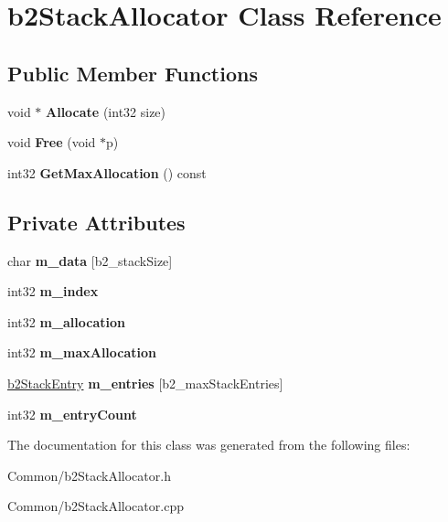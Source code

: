 \hypertarget{classb2StackAllocator}{}\section{b2\+Stack\+Allocator Class Reference}
\label{classb2StackAllocator}
\subsection*{Public Member Functions}
\begin{DoxyCompactItemize}
\item 
\mbox{\label{classb2StackAllocator_a4b8c515d8e1a1c2d5b151c3a2f96fa19}} 
void $\ast$ {\bfseries Allocate} (int32 size)
\item 
\mbox{\label{classb2StackAllocator_a3a4384cf5f467828db3022985673db66}} 
void {\bfseries Free} (void $\ast$p)
\item 
\mbox{\label{classb2StackAllocator_a9670b9ce67f939004f227d1be883404f}} 
int32 {\bfseries Get\+Max\+Allocation} () const
\end{DoxyCompactItemize}
\subsection*{Private Attributes}
\begin{DoxyCompactItemize}
\item 
\mbox{\label{classb2StackAllocator_a8f92993e1115afc12f0a8ef91dafb2db}} 
char {\bfseries m\+\_\+data} \mbox{[}b2\+\_\+stack\+Size\mbox{]}
\item 
\mbox{\label{classb2StackAllocator_ad639a2c5f0311d560808a432145880ff}} 
int32 {\bfseries m\+\_\+index}
\item 
\mbox{\label{classb2StackAllocator_a111e25a7ddc869c5087ecadf8cd79f13}} 
int32 {\bfseries m\+\_\+allocation}
\item 
\mbox{\label{classb2StackAllocator_ab77bbb95bc3506e1a4fdb0f2733a57d9}} 
int32 {\bfseries m\+\_\+max\+Allocation}
\item 
\mbox{\label{classb2StackAllocator_a493e5a470028ffbeea30c1a5e973897e}} 
\mbox{\hyperlink{structb2StackEntry}{b2\+Stack\+Entry}} {\bfseries m\+\_\+entries} \mbox{[}b2\+\_\+max\+Stack\+Entries\mbox{]}
\item 
\mbox{\label{classb2StackAllocator_a8c7f90ede3160a2c3c86cdbd80c22065}} 
int32 {\bfseries m\+\_\+entry\+Count}
\end{DoxyCompactItemize}


The documentation for this class was generated from the following files\+:\begin{DoxyCompactItemize}
\item 
Common/b2\+Stack\+Allocator.\+h\item 
Common/b2\+Stack\+Allocator.\+cpp\end{DoxyCompactItemize}
